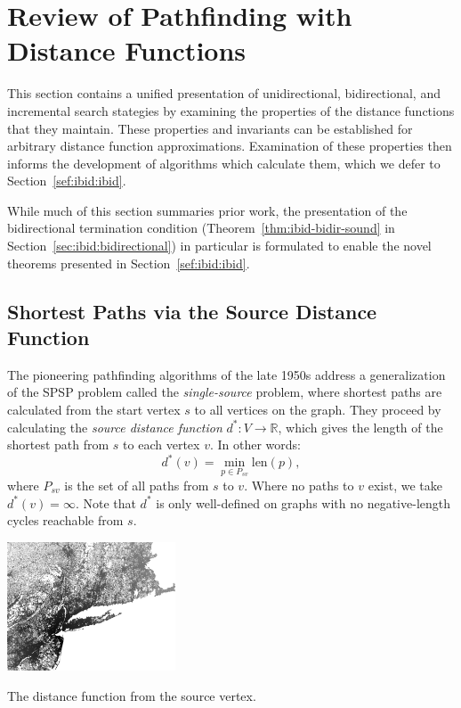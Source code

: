 \section{Review of Pathfinding with Distance Functions}
\label{sec:ibid:distance-functions}

This section contains a unified presentation of unidirectional,
bidirectional, and incremental search stategies
by examining the properties of the distance functions that they
maintain.
These properties and invariants can be established for arbitrary
distance function approximations.
Examination of these properties then informs the development of
algorithms which calculate them,
which we defer to Section~\ref{sef:ibid:ibid}.

While much of this section summaries prior work,
the presentation of the bidirectional termination condition
(Theorem~\ref{thm:ibid-bidir-sound}
in Section~\ref{sec:ibid:bidirectional})
in particular
is formulated to enable the novel theorems
presented in Section~\ref{sef:ibid:ibid}.

\subsection{Shortest Paths via the Source Distance Function}

The pioneering pathfinding algorithms of the late 1950s address
a generalization of the SPSP problem called
the \emph{single-source} problem,
where shortest paths are calculated from the start vertex $s$
to all vertices on the graph.
They proceed by calculating the \emph{source distance function}
$d^* : V \rightarrow \mathbb{R}$,
which gives the length of the shortest path from $s$
to each vertex $v$.
In other words:
\begin{equation}
   d^*(v) = \min_{p \in P_{sv}} \mbox{len}(p),
   \label{eqn:ibid-distance-function-global}
\end{equation}
where $P_{sv}$ is the set of all paths from $s$ to $v$.
Where no paths to $v$ exist,
we take $d^*(v) = \infty$.
Note that $d^*$ is only well-defined on graphs with no negative-length
cycles reachable from $s$.

\begin{marginfigure}%
   \centering%
   \includegraphics[width=5cm]{figs/incbi-road-ne/singleshot/example-dijkstraall.png}%
   \caption{The distance function from the source vertex.}%
   \label{fig:ibid:example-distance-all}%
\end{marginfigure}

